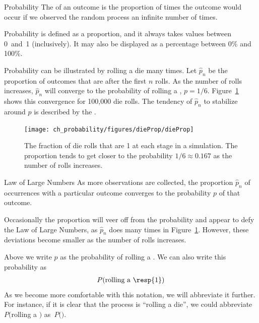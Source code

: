 \begin{onebox}{Probability}
The  of an outcome is the proportion of times the outcome would occur if we observed the random process an infinite number of times.
\end{onebox}

Probability is defined as a proportion, and it always takes values between 0~and~1 (inclusively). It may also be displayed as a percentage between 0\% and 100\%.

Probability can be illustrated by rolling a die many times. Let $\hat{p}_n$ be the proportion of outcomes that are  after the first $n$ rolls. As the number of rolls increases, $\hat{p}_n$ will converge to the probability of rolling a , $p = 1/6$. Figure~\ref{dieProp} shows this convergence for 100,000 die rolls. The tendency of $\hat{p}_n$ to stabilize around $p$ is described by the . 

\begin{figure}[bt]
\centering
\texttt{[image: ch\_probability/figures/dieProp/dieProp]}
\caption{The fraction of die rolls that are 1 at each stage in a simulation. The proportion tends to get closer to the probability $1/6 \approx 0.167$ as the number of rolls increases.}
\label{dieProp}
\end{figure}

\begin{onebox}{Law of Large Numbers}
As more observations are collected, the proportion $\hat{p}_n$ of occurrences with a particular outcome converges to the probability $p$ of that outcome.
\end{onebox}

Occasionally the proportion will veer off from the probability and appear to defy the Law of Large Numbers, as $\hat{p}_n$ does many times in Figure~\ref{dieProp}. However, these deviations become smaller as the number of rolls increases.

Above we write $p$ as the probability of rolling a . We can also write this probability as
\begin{align*}
P(\text{rolling a \resp{1}})
\end{align*}
As we become more comfortable with this notation, we will abbreviate it further. For instance, if it is clear that the process is ``rolling a die'', we could abbreviate $P($rolling a $)$ as~$P($$)$. 

